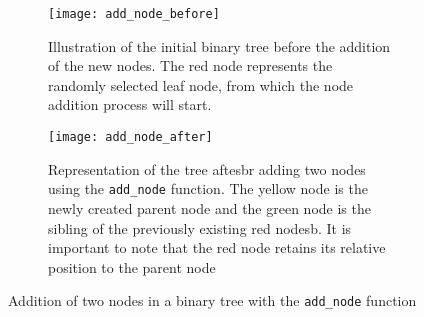 \begin{figure}[!ht]
    \centering
\begin{subfigure}{.48\textwidth}
    \centering
    \texttt{[image: add\_node\_before]}
    \caption{Illustration of the initial binary tree before the addition of the new nodes. The red node represents the randomly selected leaf node, from which the node addition process will start.} 
    \label{fig:add_node_before}
\end{subfigure}%
\hspace{1em}
\begin{subfigure}{.48\textwidth}
    \centering
    \texttt{[image: add\_node\_after]} 
    \caption{Representation of the tree aftesbr adding two nodes using the \texttt{add\_node} function. The yellow node is the newly created parent node and the green node is the sibling of the previously existing red nodesb. It is important to note that the red node retains its relative position to the parent node} 
    \label{fig:add_node_after}
\end{subfigure}
\caption{Addition of two nodes in a binary tree with the \texttt{add\_node} function}
\label{fig:add_node}
\end{figure}


